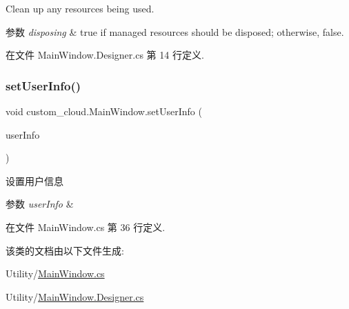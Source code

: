 Clean up any resources being used. 


\begin{DoxyParams}{参数}
{\em disposing} & true if managed resources should be disposed; otherwise, false.\\
\hline
\end{DoxyParams}


在文件 Main\+Window.\+Designer.\+cs 第 14 行定义.

\mbox{\label{classcustom__cloud_1_1_main_window_af065631df1b4fac9afa0b769cbcfbe4c}} 
\subsubsection{\texorpdfstring{set\+User\+Info()}{setUserInfo()}}
{\footnotesize\ttfamily void custom\+\_\+cloud.\+Main\+Window.\+set\+User\+Info (\begin{DoxyParamCaption}\item[{\hyperlink{classcustom__cloud_1_1_user_info}{User\+Info}}]{user\+Info }\end{DoxyParamCaption})}



设置用户信息 


\begin{DoxyParams}{参数}
{\em user\+Info} & \\
\hline
\end{DoxyParams}


在文件 Main\+Window.\+cs 第 36 行定义.



该类的文档由以下文件生成\+:\begin{DoxyCompactItemize}
\item 
Utility/\hyperlink{_main_window_8cs}{Main\+Window.\+cs}\item 
Utility/\hyperlink{_main_window_8_designer_8cs}{Main\+Window.\+Designer.\+cs}\end{DoxyCompactItemize}
